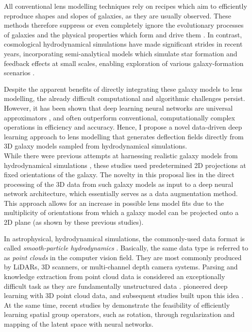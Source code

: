 \documentclass[a4paper,10pt]{article}
\begin{document}
All conventional lens modelling techniques rely on recipes which aim
to efficiently reproduce shapes and slopes of galaxies, as they are
usually observed. These methods therefore suppress or even completely
ignore the evolutionary processes of galaxies and the physical
properties which form and drive them \cite[cf.][]{Naab17}. In contrast,
cosmological hydrodynamical simulations have made significant strides
in recent years, incorporating semi-analytical models which simulate
star formation and feedback effects at small scales, enabling
exploration of various galaxy-formation scenarios
\citep[e.g.][]{Pillepich17,Weinberger16,Vogelsberger14}.

Despite the apparent benefits of directly integrating these galaxy
models to lens modelling, the already difficult computational and
algorithmic challenges persist. However, it has been shown that deep
learning neural networks are universal approximators
\citep{Hornik89,Kratsios20}, and often outperform conventional,
computationally complex operations in efficiency and accuracy. Hence,
I propose a novel data-driven deep learning approach to lens modelling
that generates deflection fields directly from 3D galaxy models
sampled from hydrodynamical simulations. \\[0pt]
While there were previous attempts at harnessing realistic galaxy
models from hydrodynamical simulations \citep[see][]{Adam22,Denzel21},
these studies used predetermined 2D projections at fixed orientations
of the galaxy. The novelty in this proposal lies in the direct
processing of the 3D data from such galaxy models as input to a deep
neural network architecture, which essentially serves as a data
augmentation method. This approach allows for an increase in possible
lens model fits due to the multiplicity of orientations from which a
galaxy model can be projected onto a 2D plane (as shown by these
previous studies).

In astrophysical, hydrodynamical simulations, the commonly-used data
format is called \emph{smooth-particle hydrodynamics}
\citep{Gingold77,Lucy77,Monaghan92}. Basically, the same data
type is referred to as \emph{point clouds} in the computer vision
field. They are most commonly produced by LiDARs, 3D scanners, or
multi-channel depth camera systems. Parsing and knowledge extraction
from point cloud data is considered an exceptionally difficult task as
they are fundamentally unstructured data
\citep[cf.][]{Vinyals2015,Armeni16,Rufus20,Zhang15,Nuechter07,Rusinkiewicz00}.
\cite{Qi16} pioneered deep learning with 3D point cloud data, and
subsequent studies built upon this idea
\citep[see][]{Qi17,BenShabat17,Klokov17,Kaul21,AbadRocamora22}. \\[0pt]
At the same time, recent studies by \cite{Quessard20,Keurti22}
demonstrate the feasibility of efficiently learning spatial group
operators, such as rotation, through regularization and mapping of the
latent space with neural networks.
\end{document}
